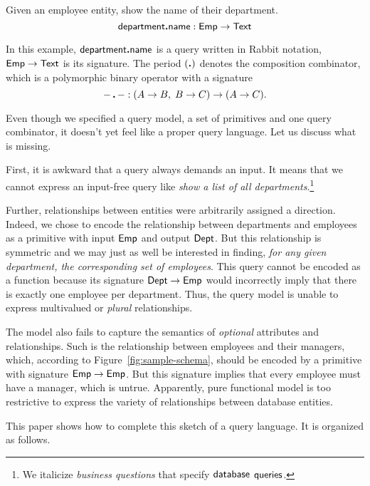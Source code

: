 \begin{demo}
    Given an employee entity, show the name of their department.
    \begin{equation*}
        \mathsf{department}\boldsymbol{.}\mathsf{name}: \mathsf{Emp} \to \mathsf{Text}
    \end{equation*}
\end{demo}

In this example, $\mathsf{department}\boldsymbol{.}\mathsf{name}$ is a query written in Rabbit notation,
$\mathsf{Emp} \to \mathsf{Text}$ is its signature.  The period $(\boldsymbol{.})$ denotes the composition
combinator, which is a polymorphic binary operator with a signature
\begin{equation*}
        {-}\,\boldsymbol{.}\,{-} : (A \to B,\; B \to C) \to (A \to C).
\end{equation*}

Even though we specified a query model, a set of primitives and one query
combinator, it doesn't yet feel like a proper query language.  Let us discuss
what is missing.

First, it is awkward that a query always demands an input.  It means that we
cannot express an input-free query like \emph{show a list of all
departments}.\footnote{We italicize \emph{business questions} that specify
$\mathsf{database}$ $\mathsf{queries}$.}

Further, relationships between entities were arbitrarily assigned a direction.
Indeed, we chose to encode the relationship between departments and employees
as a primitive with input $\mathsf{Emp}$ and output $\mathsf{Dept}$.  But this relationship is
symmetric and we may just as well be interested in finding, \emph{for any given
department, the corresponding set of employees}.  This query cannot be encoded
as a function because its signature $\mathsf{Dept} \to \mathsf{Emp}$ would incorrectly imply
that there is exactly one employee per department.  Thus, the query model
is unable to express multivalued or \emph{plural} relationships.

The model also fails to capture the semantics of \emph{optional} attributes and
relationships.  Such is the relationship between employees and their managers,
which, according to Figure~\ref{fig:sample-schema}, should be encoded by a
primitive with signature $\mathsf{Emp} \to \mathsf{Emp}$.  But this signature implies that
every employee must have a manager, which is untrue.  Apparently, pure
functional model is too restrictive to express the variety of relationships
between database entities.

This paper shows how to complete this sketch of a query language.  It is
organized as follows.

